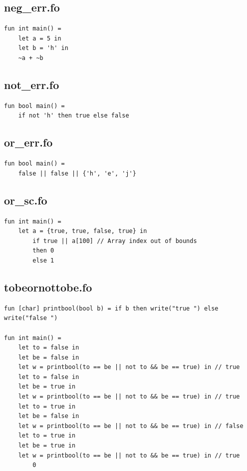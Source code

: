 \documentclass[11pt]{article}
\begin{document}
    \subsection{neg\_err.fo}
    \begin{lstlisting}[basicstyle=\small]
fun int main() =
    let a = 5 in
    let b = 'h' in
    ~a + ~b
    \end{lstlisting}

    \subsection{not\_err.fo}
    \begin{lstlisting}[basicstyle=\small]
fun bool main() =
    if not 'h' then true else false
    \end{lstlisting}

    \subsection{or\_err.fo}
    \begin{lstlisting}[basicstyle=\small]
fun bool main() =
    false || false || {'h', 'e', 'j'}
    \end{lstlisting}

    \subsection{or\_sc.fo}
    \begin{lstlisting}[basicstyle=\small]
fun int main() =
    let a = {true, true, false, true} in
        if true || a[100] // Array index out of bounds
        then 0
        else 1
    \end{lstlisting}

    \subsection{tobeornottobe.fo}
    \begin{lstlisting}[basicstyle=\small]
fun [char] printbool(bool b) = if b then write("true ") else write("false ")

fun int main() =
    let to = false in
    let be = false in
    let w = printbool(to == be || not to && be == true) in // true
    let to = false in
    let be = true in
    let w = printbool(to == be || not to && be == true) in // true
    let to = true in
    let be = false in
    let w = printbool(to == be || not to && be == true) in // false
    let to = true in
    let be = true in
    let w = printbool(to == be || not to && be == true) in // true
        0
    \end{lstlisting}
\end{document}
